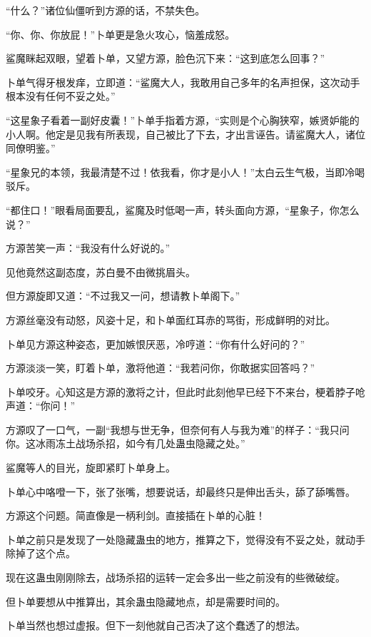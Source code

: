 
\begin{this_body}

“什么？”诸位仙僵听到方源的话，不禁失色。

“你、你、你放屁！”卜单更是急火攻心，恼羞成怒。

鲨魔眯起双眼，望着卜单，又望方源，脸色沉下来：“这到底怎么回事？”

卜单气得牙根发痒，立即道：“鲨魔大人，我敢用自己多年的名声担保，这次动手根本没有任何不妥之处。”

“这星象子看着一副好皮囊！”卜单手指着方源，“实则是个心胸狭窄，嫉贤妒能的小人啊。他定是见我有所表现，自己被比了下去，才出言诬告。请鲨魔大人，诸位同僚明鉴。”

“星象兄的本领，我最清楚不过！依我看，你才是小人！”太白云生气极，当即冷喝驳斥。

“都住口！”眼看局面要乱，鲨魔及时低喝一声，转头面向方源，“星象子，你怎么说？”

方源苦笑一声：“我没有什么好说的。”

见他竟然这副态度，苏白曼不由微挑眉头。

但方源旋即又道：“不过我又一问，想请教卜单阁下。”

方源丝毫没有动怒，风姿十足，和卜单面红耳赤的骂街，形成鲜明的对比。

卜单见方源这种姿态，更加嫉恨厌恶，冷哼道：“你有什么好问的？”

方源淡淡一笑，盯着卜单，激将他道：“我若问你，你敢据实回答吗？”

卜单咬牙。心知这是方源的激将之计，但此时此刻他早已经下不来台，梗着脖子呛声道：“你问！”

方源叹了一口气，一副“我想与世无争，但奈何有人与我为难”的样子：“我只问你。这冰雨冻土战场杀招，如今有几处蛊虫隐藏之处。”

鲨魔等人的目光，旋即紧盯卜单身上。

卜单心中咯噔一下，张了张嘴，想要说话，却最终只是伸出舌头，舔了舔嘴唇。

方源这个问题。简直像是一柄利剑。直接插在卜单的心脏！

卜单之前只是发现了一处隐藏蛊虫的地方，推算之下，觉得没有不妥之处，就动手除掉了这个点。

现在这蛊虫刚刚除去，战场杀招的运转一定会多出一些之前没有的些微破绽。

但卜单要想从中推算出，其余蛊虫隐藏地点，却是需要时间的。

卜单当然也想过虚报。但下一刻他就自己否决了这个蠢透了的想法。


\end{this_body}
